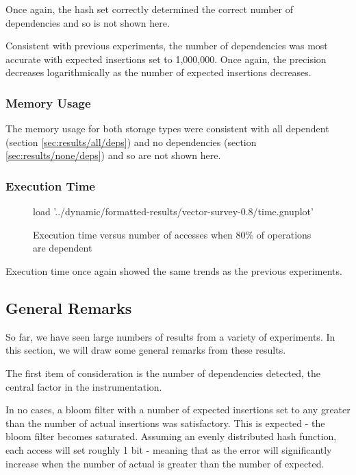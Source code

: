 		Once again, the hash set correctly determined the correct number of dependencies and so is not shown here.
			
		Consistent with previous experiments, the number of dependencies was most accurate with expected insertions set to 1,000,000. Once again, the precision decreases logarithmically as the number of expected insertions decreases.
		
		\subsubsection{Memory Usage} \label{sec:results/80/mem}
		The memory usage for both storage types were consistent with all dependent (section \ref{sec:results/all/deps}) and no dependencies (section \ref{sec:results/none/deps}) and so are not shown here.
		
		\subsubsection{Execution Time} \label{sec:results/80/time}
		\begin{figure}
			\centering
			\begin{gnuplot}[terminal=pdf]
				load '../dynamic/formatted-results/vector-survey-0.8/time.gnuplot'
			\end{gnuplot}
			\caption{Execution time versus number of accesses when 80\% of operations are dependent}
			\label{chart:80-time}
		\end{figure}
		
		Execution time once again showed the same trends as the previous experiments.

	\subsection{General Remarks} \label{sec:results/general-remarks}
	So far, we have seen large numbers of results from a variety of experiments. In this section, we will draw some general remarks from these results.
	
	The first item of consideration is the number of dependencies detected, the central factor in the instrumentation.
	
	In no cases, a bloom filter with a number of expected insertions set to any greater than the number of actual insertions was satisfactory. This is expected - the bloom filter becomes saturated. Assuming an evenly distributed hash function, each access will set roughly 1 bit - meaning that as the error will significantly increase when the number of actual is greater than the number of expected. 
	
